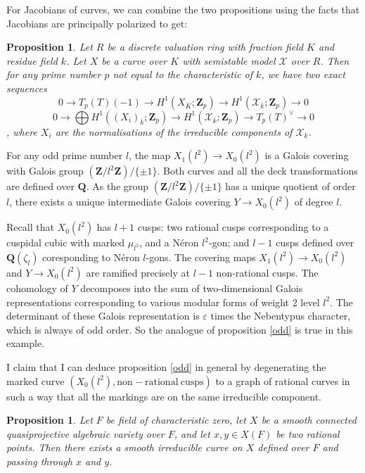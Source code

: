 \documentclass{article}
\newtheorem{proposition}[theorem]{Proposition}
\theoremstyle{definition}
\begin{document}
	For Jacobians of curves, we can combine the two propositions using the facts that Jacobians are principally polarized to get:
	\begin{proposition} \label{degen}
		Let $R$ be a discrete valuation ring with fraction field $K$ and residue field $k$. Let $X$ be a curve over $K$ with semistable model $\mathcal{X}$ over $R$. Then for any prime number $p$ not equal to the characteristic of $k$, we have two exact sequences
		$$0 \to T_p(T)(-1) \to H^1(X_{\overline{K}}; \mathbf{Z}_p) \to H^1(\mathcal{X}_{\overline{k}}; \mathbf{Z}_p) \to 0$$
		$$0 \to \bigoplus H^1((X_i)_{\overline{k}}; \mathbf{Z}_p) \to H^1(\mathcal{X}_{\overline{k}}; \mathbf{Z}_p) \to T_p(T)^{\vee} \to 0$$, 
		where $X_i$ are the normalisations of the irreducible components of $\mathcal{X}_k$.
	\end{proposition}
	For any odd prime number $l$, the map $X_1(l^2) \to X_0(l^2)$ is a Galois covering with Galois group $(\mathbf{Z}/l^2 \mathbf{Z})/\{\pm 1\}$. Both curves and all the deck transformations are defined over $\mathbf{Q}$. As the group $(\mathbf{Z}/l^2 \mathbf{Z})/\{\pm 1\}$ has a unique quotient of order $l$, there exists a unique intermediate Galois covering $Y \to X_0(l^2)$ of degree $l$. \par 
	Recall that $X_0(l^2)$ has $l+1$ cusps: two rational cusps corresponding to a cuspidal cubic with marked $\mu_{l^2}$, and a N\'eron $l^2$-gon; and $l-1$ cusps defined over $\mathbf{Q}(\zeta_l)$ coresponding to N\'eron $l$-gons. The covering maps $X_1(l^2) \to X_0(l^2)$ and $Y \to X_0(l^2)$ are ramified precisely at $l-1$ non-rational cusps. The cohomology of $Y$ decomposes into the sum of two-dimensional Galois representations corresponding to various modular forms of weight $2$ level $l^2$. The determinant of these Galois representation is $\varepsilon$ times the Nebentypus character, which is always of odd order. So the analogue of proposition \ref{odd} is true in this example. \par 
	I claim that I can deduce proposition \ref{odd} in general by degenerating the marked curve $(X_0(l^2), \mathrm{non-rational \ cusps})$ to a graph of rational curves in such a way that all the markings are on the same irreducible component.
	\begin{proposition}
		Let $F$ be field of characteristic zero, let $X$ be a smooth connected quasiprojective algebraic variety over $F$, and let $x, y \in X(F)$ be two rational points. Then there exists a smooth irreducible curve on $X$ defined over $F$ and passing through $x$ and $y$.
	\end{proposition}
\end{document}
